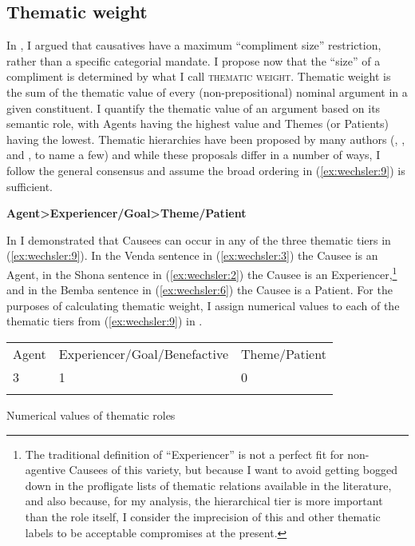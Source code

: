 \documentclass[output=paper]{langscibook}
\begin{document}
\subsection{Thematic weight}\label{sec:wechsler:2.3}

In , I argued that causatives have a maximum “compliment size” restriction, rather than a specific categorial mandate. I propose now that the “size” of a compliment is determined by what I call \textsc{thematic} \textsc{weight.} Thematic weight is the sum of the thematic value of every (non-prepositional) nominal argument in a given constituent. I quantify the thematic value of an argument based on its semantic role, with Agents having the highest value and Themes (or Patients) having the lowest. Thematic hierarchies have been proposed by many authors (\citealt{Jackendoff1972}, \citealt{BellettiRizzi1988}, and \citealt{Grimshaw1990}, to name a few) and while these proposals differ in a number of ways, I follow the general consensus and assume the broad ordering in (\ref{ex:wechsler:9}) is sufficient.


\ea\label{ex:wechsler:9}
\textbf{Agent>Experiencer/Goal>Theme/Patient}\\
\z

In  I demonstrated that Causees can occur in any of the three thematic tiers in (\ref{ex:wechsler:9}). In the Venda sentence in (\ref{ex:wechsler:3}) the Causee is an Agent, in the Shona sentence in (\ref{ex:wechsler:2}) the Causee is an Experiencer,\footnote{The traditional definition of “Experiencer” is not a perfect fit for non-agentive Causees of this variety, but because I want to avoid getting bogged down in the profligate lists of thematic relations available in the literature, and also because, for my analysis, the hierarchical tier is more important than the role itself, I consider the imprecision of this and other thematic labels to be acceptable compromises at the present.}  and in the Bemba sentence in (\ref{ex:wechsler:6}) the Causee is a Patient. For the purposes of calculating thematic weight, I assign numerical values to each of the thematic tiers from (\ref{ex:wechsler:9}) in . 


\tablefirsthead{}

\tabletail{}
\tablelasttail{}
\begin{tabularx}{\textwidth}{XXX}
\lsptoprule
 Agent & Experiencer/Goal/Benefactive & Theme/Patient\\
 3 & 1 & 0\\
\lspbottomrule
\end{tabularx}
\begin{table}
\caption{Numerical values of thematic roles}
\label{tab:1}
\end{table}
\end{document}
